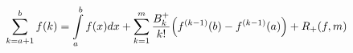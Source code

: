 \documentclass{standalone}
\begin{document}
$\displaystyle
    \sum_{k=a+1}^{b} f(k) = \int\displaylimits_a^b f(x)dx + \sum_{k=1}^m \frac{B_k^+}{k!}\Big(f^{(k-1)}(b)-f^{(k-1)}(a)\Big) + R_+(f,m)
$
\end{document}
